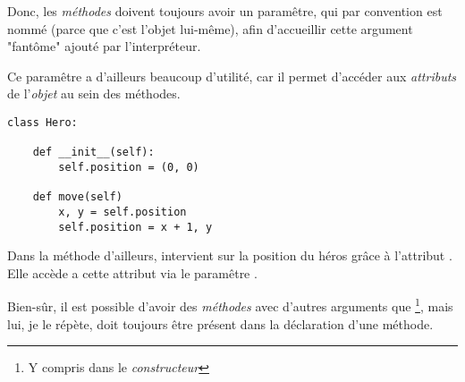 Donc, les \emph{méthodes} doivent toujours avoir un paramêtre, qui par convention est nommé  (parce que c'est l'objet lui-même), afin d'accueillir cette argument "fantôme" ajouté par l'interpréteur.

Ce paramêtre a d'ailleurs beaucoup d'utilité, car il permet d'accéder aux \emph{attributs} de l'\emph{objet} au sein des méthodes.

\begin{lstlisting}
class Hero:

	def __init__(self):
		self.position = (0, 0)
		
	def move(self)
		x, y = self.position
		self.position = x + 1, y
\end{lstlisting}

Dans la méthode  d'ailleurs, intervient sur la position du héros grâce à l'attribut . Elle accède a cette attribut via le paramêtre .

Bien-sûr, il est possible d'avoir des \emph{méthodes} avec d'autres arguments que \footnote{Y compris dans le \emph{constructeur}}, mais lui, je le répète, doit toujours être présent dans la déclaration d'une méthode.